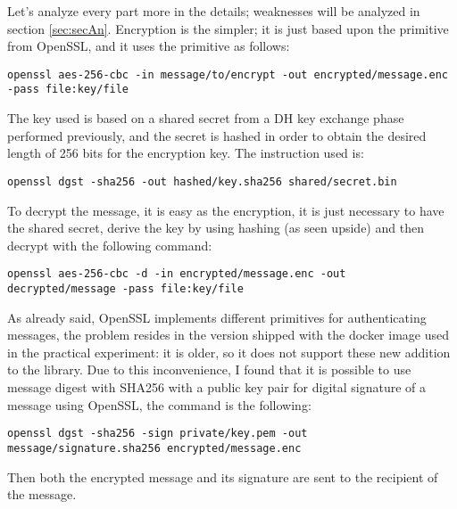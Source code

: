 \documentclass{article}
\begin{document}
Let's analyze every part more in the details; weaknesses will be analyzed in section \ref{sec:secAn}.\newline
Encryption is the simpler; it is just based upon the primitive from OpenSSL, and it uses the primitive as follows: 

\begin{lstlisting}[breaklines]
	openssl aes-256-cbc -in message/to/encrypt -out encrypted/message.enc -pass file:key/file
\end{lstlisting}

The key used is based on a shared secret from a DH key exchange phase performed previously, and the secret is hashed in order to obtain the desired length of 256 bits for the encryption key. The instruction used is:

\begin{lstlisting}[breaklines]
	openssl dgst -sha256 -out hashed/key.sha256 shared/secret.bin
\end{lstlisting}

To decrypt the message, it is easy as the encryption, it is just necessary to have the shared secret, derive the key by using hashing (as seen upside) and then decrypt with the following command:

\begin{lstlisting}[breaklines]
	openssl aes-256-cbc -d -in encrypted/message.enc -out decrypted/message -pass file:key/file
\end{lstlisting}

As already said, OpenSSL implements different primitives for authenticating messages, the problem resides in the version shipped with the docker image used in the practical experiment: it is older, so it does not support these new addition to the library. Due to this inconvenience, I found \cite{signatures} that it is possible to use message digest with SHA256 with a public key pair for digital signature of a message using OpenSSL, the command is the following:

\begin{lstlisting}[breaklines]
	openssl dgst -sha256 -sign private/key.pem -out message/signature.sha256 encrypted/message.enc
\end{lstlisting}

Then both the encrypted message and its signature are sent to the recipient of the message.





\end{document}
